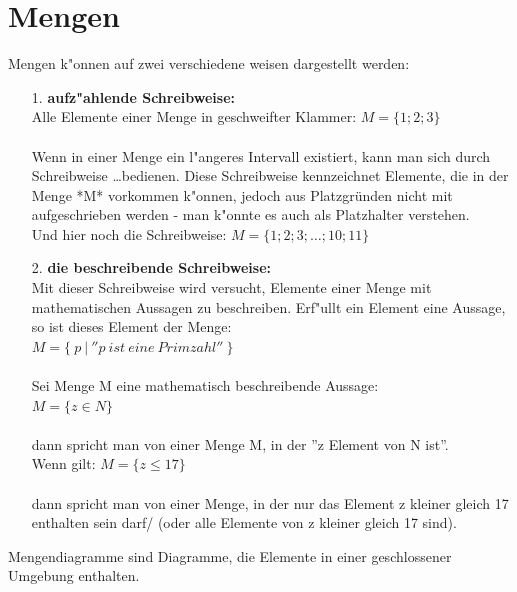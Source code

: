 \documentclass[10pt]{book}
\begin{document}
\chapter{Mengen}
Mengen k"onnen auf zwei verschiedene weisen dargestellt werden:
\begin{itemize}
  \item[1.]   \textbf{aufz"ahlende Schreibweise:}\\
  Alle Elemente einer Menge in geschweifter Klammer:
  $M = \{ 1;2;3 \}$ \\ \\
  Wenn in einer Menge ein l"angeres Intervall existiert,
  kann man sich durch Schreibweise \ldots bedienen.
  Diese Schreibweise kennzeichnet Elemente, die in der
  Menge *M* vorkommen k"onnen, jedoch aus Platzgründen
  nicht mit aufgeschrieben werden - man k"onnte es auch
  als Platzhalter verstehen. \\
  Und hier noch die Schreibweise: 
  $M = \{ 1;2;3; \ldots ;10;11 \}$
  \item[2.] \textbf{die beschreibende Schreibweise:} \\
  Mit dieser Schreibweise wird versucht, Elemente einer
  Menge mit mathematischen Aussagen zu beschreiben. Erf"ullt
  ein Element eine Aussage, so ist dieses Element der Menge: \\
  $M = \{ \: p \: | \: '' p \: ist \: eine \: Primzahl '' \: \}$ \\
  \\
  Sei Menge M eine mathematisch beschreibende Aussage:\\
  $M = \{z \in N \}$ \\
  \\
  dann spricht man von einer Menge M, in der ''z Element von N ist''. \\
  Wenn gilt: $M = \{z \le 17\}$\\
  \\
  dann spricht man von einer Menge, in der nur das Element z
  kleiner gleich 17 enthalten sein darf/ (oder alle Elemente
  von z kleiner gleich 17 sind). \\
\end{itemize}
Mengendiagramme sind Diagramme, die Elemente in einer
geschlossener Umgebung enthalten.
\end{document}
